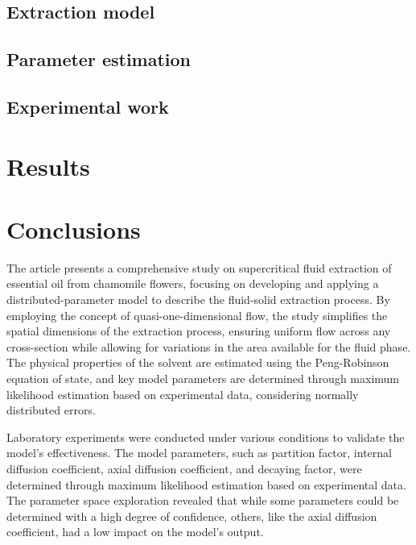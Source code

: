 \documentclass[a4paper,fleqn]{cas-dc}
\begin{document}
\subsection{Extraction model} \label{CH: Extraction_model}


\subsection{Parameter estimation} \label{CH: Parameter_estimation}


\subsection{Experimental work}


\section{Results}


\section{Conclusions} \label{CH: Conclusion}

The article presents a comprehensive study on supercritical fluid extraction of essential oil from chamomile flowers, focusing on developing and applying a distributed-parameter model to describe the fluid-solid extraction process. By employing the concept of quasi-one-dimensional flow, the study simplifies the spatial dimensions of the extraction process, ensuring uniform flow across any cross-section while allowing for variations in the area available for the fluid phase. The physical properties of the solvent are estimated using the Peng-Robinson equation of state, and key model parameters are determined through maximum likelihood estimation based on experimental data, considering normally distributed errors.

Laboratory experiments were conducted under various conditions to validate the model's effectiveness. The model parameters, such as partition factor, internal diffusion coefficient, axial diffusion coefficient, and decaying factor, were determined through maximum likelihood estimation based on experimental data. The parameter space exploration revealed that while some parameters could be determined with a high degree of confidence, others, like the axial diffusion coefficient, had a low impact on the model's output.
\end{document}
